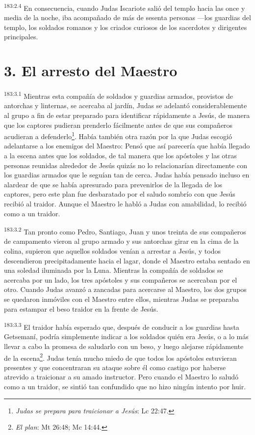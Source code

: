 \par 
\textsuperscript{183:2.4} En consecuencia, cuando Judas Iscariote salió del templo hacia las once y media de la noche, iba acompañado de más de sesenta personas ---los guardias del templo, los soldados romanos y los criados curiosos de los sacerdotes y dirigentes principales.

\section*{3. El arresto del Maestro}
\par 
\textsuperscript{183:3.1} Mientras esta compañía de soldados y guardias armados, provistos de antorchas y linternas, se acercaba al jardín, Judas se adelantó considerablemente al grupo a fin de estar preparado para identificar rápidamente a Jesús, de manera que los captores pudieran prenderlo fácilmente antes de que sus compañeros acudieran a defenderlo\footnote{\textit{Judas se prepara para traicionar a Jesús}: Lc 22:47.}. Había también otra razón por la que Judas escogió adelantarse a los enemigos del Maestro: Pensó que así parecería que había llegado a la escena antes que los soldados, de tal manera que los apóstoles y las otras personas reunidas alrededor de Jesús quizás no lo relacionarían directamente con los guardias armados que le seguían tan de cerca. Judas había pensado incluso en alardear de que se había apresurado para prevenirlos de la llegada de los captores, pero este plan fue desbaratado por el saludo sombrío con que Jesús recibió al traidor. Aunque el Maestro le habló a Judas con amabilidad, lo recibió como a un traidor.

\par 
\textsuperscript{183:3.2} Tan pronto como Pedro, Santiago, Juan y unos treinta de sus compañeros de campamento vieron al grupo armado y sus antorchas girar en la cima de la colina, supieron que aquellos soldados venían a arrestar a Jesús, y todos descendieron precipitadamente hacia el lagar, donde el Maestro estaba sentado en una soledad iluminada por la Luna. Mientras la compañía de soldados se acercaba por un lado, los tres apóstoles y sus compañeros se acercaban por el otro. Cuando Judas avanzó a zancadas para acercarse al Maestro, los dos grupos se quedaron inmóviles con el Maestro entre ellos, mientras Judas se preparaba para estampar el beso traidor en la frente de Jesús.

\par 
\textsuperscript{183:3.3} El traidor había esperado que, después de conducir a los guardias hasta Getsemaní, podría simplemente indicar a los soldados quién era Jesús, o a lo más llevar a cabo la promesa de saludarlo con un beso, y luego alejarse rápidamente de la escena\footnote{\textit{El plan}: Mt 26:48; Mc 14:44.}. Judas tenía mucho miedo de que todos los apóstoles estuvieran presentes y que concentraran su ataque sobre él como castigo por haberse atrevido a traicionar a su amado instructor. Pero cuando el Maestro lo saludó como a un traidor, se sintió tan confundido que no hizo ningún intento por huir.


